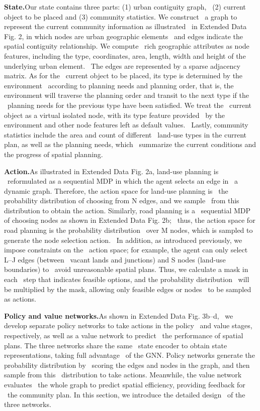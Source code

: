 \textbf{State.}Our state contains three parts: (1) urban contiguity graph, \
(2) current object to be placed and (3) community statistics. We construct \
a graph to represent the current community information as illustrated \
in Extended Data Fig. 2, in which nodes are urban geographic elements \
and edges indicate the spatial contiguity relationship. We compute \
rich geographic attributes as node features, including the type, coordinates, area, length, width and height of the underlying urban element. \
The edges are represented by a sparse adjacency matrix. As for the \
current object to be placed, its type is determined by the environment \
according to planning needs and planning order, that is, the environment will traverse the planning order and transit to the next type if the \
planning needs for the previous type have been satisfied. We treat the \
current object as a virtual isolated node, with its type feature provided \
by the environment and other node features left as default values. \
Lastly, community statistics include the area and count of different \
land-use types in the current plan, as well as the planning needs, which \
summarize the current conditions and the progress of spatial planning.

\textbf{Action.}As illustrated in Extended Data Fig. 2a, land-use planning is \
reformulated as a sequential MDP in which the agent selects an edge in \
a dynamic graph. Therefore, the action space for land-use planning is \
the probability distribution of choosing from N edges, and we sample \
from this distribution to obtain the action. Similarly, road planning is a \
sequential MDP of choosing nodes as shown in Extended Data Fig. 2b; \
thus, the action space for road planning is the probability distribution \
over M nodes, which is sampled to generate the node selection action. \
In addition, as introduced previously, we impose constraints on the \
action space; for example, the agent can only select L–J edges (between \
vacant lands and junctions) and S nodes (land-use boundaries) to \
avoid unreasonable spatial plans. Thus, we calculate a mask in each \
step that indicates feasible options, and the probability distribution \
will be multiplied by the mask, allowing only feasible edges or nodes \
to be sampled as actions.

\textbf{Policy and value networks.}As shown in Extended Data Fig. 3b–d, \
we develop separate policy networks to take actions in the policy \
and value stages, respectively, as well as a value network to predict \
the performance of spatial plans. The three networks share the same \
state encoder to obtain state representations, taking full advantage \
of the GNN. Policy networks generate the probability distribution by \
scoring the edges and nodes in the graph, and then sample from this \
distribution to take actions. Meanwhile, the value network evaluates \
the whole graph to predict spatial efficiency, providing feedback for \
the community plan. In this section, we introduce the detailed design \
of the three networks.

